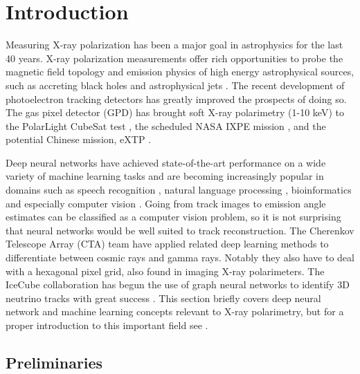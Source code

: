 \chapter{Introduction}
\label{chap:intro}

Measuring X-ray polarization has been a major goal in astrophysics for the last 40 years. X-ray polarization measurements offer rich opportunities to probe the magnetic field topology and emission physics of high energy astrophysical sources, such as accreting black holes and astrophysical jets \citep{krawczynski_using_2019, weisskopf_overview_2018}. 
The recent development of photoelectron tracking detectors \citep{bellazzini_novel_2003} has greatly improved the prospects of doing so. The gas pixel detector (GPD) \citep{bellazzini_sealed_2007} has brought soft X-ray polarimetry (1-10 keV) to the PolarLight CubeSat test \citep{feng_x-ray_2020}, the scheduled NASA IXPE mission \citep{sgro_imaging_2019}, and the potential Chinese mission, eXTP \citep{zhang_extp_2017}. 

Deep neural networks have achieved state-of-the-art performance on a wide variety of machine learning tasks and are becoming increasingly popular in domains such as speech recognition \citep{graves_connectionist_2006}, natural language processing \citep{young_recent_2018}, bioinformatics \citep{tang_recent_2019} and especially computer vision \citep{krizhevsky_imagenet_2012}. Going from track images to emission angle estimates can be classified as a computer vision problem, so it is not surprising that neural networks would be well suited to track reconstruction. The Cherenkov Telescope Array (CTA) \citep{brill_investigating_2019} team have applied related deep learning methods to differentiate between cosmic rays and gamma rays. Notably they also have to deal with a hexagonal pixel grid, also found in imaging X-ray polarimeters. The IceCube collaboration has begun the use of graph neural networks to identify 3D neutrino tracks with great success \citep{choma_graph_2018}. 
This section briefly covers deep neural network and machine learning concepts relevant to X-ray polarimetry, but for a proper introduction to this important field see \citet{goodfellow_deep_2016, hastie_elements_2009}.

\section{Preliminaries}
\label{sec:prelim}

